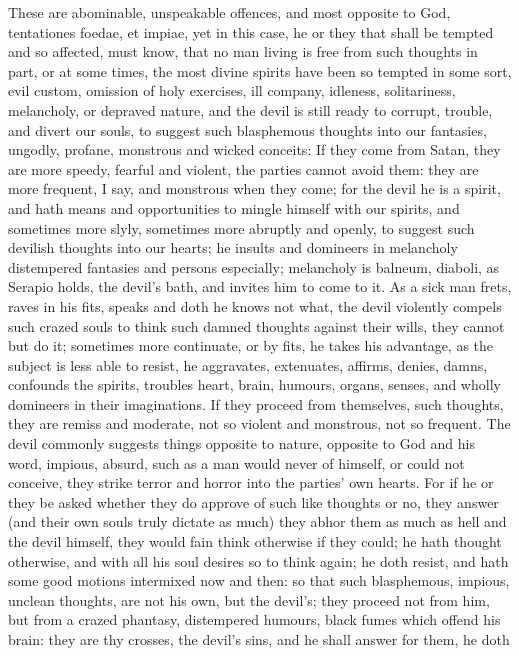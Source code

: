 {These are abominable, unspeakable offences, and most opposite to God,
tentationes foedae, et impiae, yet in this case, he or they that shall
be tempted and so affected, must know, that no man living is free from
such thoughts in part, or at some times, the most divine spirits have
been so tempted in some sort, evil custom, omission of holy exercises,
ill company, idleness, solitariness, melancholy, or depraved nature,
and the devil is still ready to corrupt, trouble, and divert our souls,
to suggest such blasphemous thoughts into our fantasies, ungodly,
profane, monstrous and wicked conceits: If they come from Satan, they
are more speedy, fearful and violent, the parties cannot avoid them:
they are more frequent, I say, and monstrous when they come; for the
devil he is a spirit, and hath means and opportunities to mingle
himself with our spirits, and sometimes more slyly, sometimes more
abruptly and openly, to suggest such devilish thoughts into our hearts;
he insults and domineers in melancholy distempered fantasies and
persons especially; melancholy is balneum, diaboli, as Serapio holds,
the devil's bath, and invites him to come to it. As a sick man frets,
raves in his fits, speaks and doth he knows not what, the devil
violently compels such crazed souls to think such damned thoughts
against their wills, they cannot but do it; sometimes more continuate,
or by fits, he takes his advantage, as the subject is less able to
resist, he aggravates, extenuates, affirms, denies, damns, confounds
the spirits, troubles heart, brain, humours, organs, senses, and wholly
domineers in their imaginations. If they proceed from themselves, such
thoughts, they are remiss and moderate, not so violent and monstrous,
not so frequent. The devil commonly suggests things opposite to nature,
opposite to God and his word, impious, absurd, such as a man would
never of himself, or could not conceive, they strike terror and horror
into the parties' own hearts. For if he or they be asked whether they
do approve of such like thoughts or no, they answer (and their own
souls truly dictate as much) they abhor them as much as hell and the
devil himself, they would fain think otherwise if they could; he hath
thought otherwise, and with all his soul desires so to think again; he
doth resist, and hath some good motions intermixed now and then: so
that such blasphemous, impious, unclean thoughts, are not his own, but
the devil's; they proceed not from him, but from a crazed phantasy,
distempered humours, black fumes which offend his brain: they are
thy crosses, the devil's sins, and he shall answer for them, he doth
}
